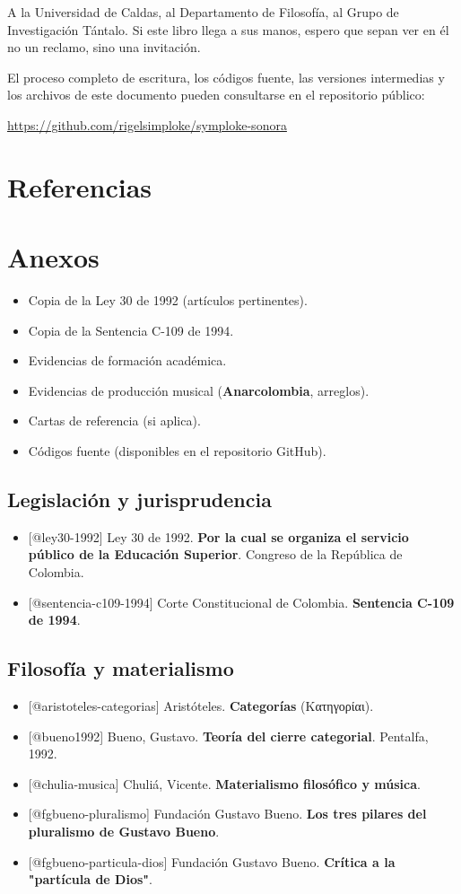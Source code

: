 \documentclass[14pt, a4paper]{article}
\begin{document}
A la Universidad de Caldas, al Departamento de Filosofía, al Grupo de
Investigación Tántalo. Si este libro llega a sus manos, espero que
sepan ver en él no un reclamo, sino una invitación.

El proceso completo de escritura, los códigos fuente, las versiones
intermedias y los archivos de este documento pueden consultarse en el
repositorio público:

\url{https://github.com/rigelsimploke/symploke-sonora}
\section{Referencias}
\label{referencias}
\printbibliography
\section{Anexos}
\label{anexos}
\begin{itemize}
\item[{$\square$}] Copia de la Ley 30 de 1992 (artículos pertinentes).
\item[{$\square$}] Copia de la Sentencia C-109 de 1994.
\item[{$\square$}] Evidencias de formación académica.
\item[{$\square$}] Evidencias de producción musical (\textbf{Anarcolombia}, arreglos).
\item[{$\square$}] Cartas de referencia (si aplica).
\item[{$\square$}] Códigos fuente (disponibles en el repositorio GitHub).
\end{itemize}
\subsection{Legislación y jurisprudencia}
\label{ref-legislacion}
\begin{itemize}
\item {[}@ley30-1992] Ley 30 de 1992. \textbf{Por la cual se organiza el servicio
público de la Educación Superior}. Congreso de la República de
Colombia.
\item {[}@sentencia-c109-1994] Corte Constitucional de Colombia. \textbf{Sentencia
C-109 de 1994}.
\end{itemize}
\subsection{Filosofía y materialismo}
\label{ref-filosofia}
\begin{itemize}
\item {[}@aristoteles-categorias] Aristóteles. \textbf{Categorías} (Κατηγορίαι).
\item {[}@bueno1992] Bueno, Gustavo. \textbf{Teoría del cierre categorial}.
Pentalfa, 1992.
\item {[}@chulia-musica] Chuliá, Vicente. \textbf{Materialismo filosófico y
música}.
\item {[}@fgbueno-pluralismo] Fundación Gustavo Bueno. \textbf{Los tres pilares del
pluralismo de Gustavo Bueno}.
\item {[}@fgbueno-particula-dios] Fundación Gustavo Bueno. \textbf{Crítica a la
"partícula de Dios"}.
\end{itemize}
\end{document}
